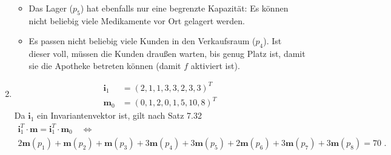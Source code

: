 \documentclass[a4paper]{scrartcl}
\newcommand{\gdw}{\Leftrightarrow}
\begin{document}
\begin{enumerate}
\begin{itemize}
            \item
                Das Lager ($p_5$) hat ebenfalls nur eine begrenzte Kapazität:
                Es können nicht beliebig viele Medikamente vor Ort gelagert
                werden.

            \item
                Es passen nicht beliebig viele Kunden in den Verkaufsraum
                ($p_4$).
                Ist dieser voll, müssen die Kunden draußen warten, bis genug
                Platz ist, damit sie die Apotheke betreten können (damit $f$
                aktiviert ist).

        \end{itemize}

    \item
        \begin{align}
            \textbf{i}_1 &= \left( 2, 1, 1, 3, 3, 2, 3, 3 \right)^T \\
            \textbf{m}_0 &= \left( 0, 1, 2, 0, 1, 5, 10, 8 \right)^T
        \end{align}
        Da $\textbf{i}_1$ ein Invariantenvektor ist, gilt nach Satz 7.32
        \begin{equation}
            \begin{gathered}
                \textbf{i}_1^T \cdot \textbf{m} = \textbf{i}_1^T \cdot \textbf{m}_0 \quad \gdw \\
                2\textbf{m}(p_1) + \textbf{m}(p_2) + \textbf{m}(p_3) + 3\textbf{m}(p_4) + 3\textbf{m}(p_5) + 2\textbf{m}(p_6) + 3\textbf{m}(p_7) + 3\textbf{m}(p_8) = 70
                \text{ .}
            \end{gathered}
        \end{equation}
        


\end{enumerate}
\end{document}
